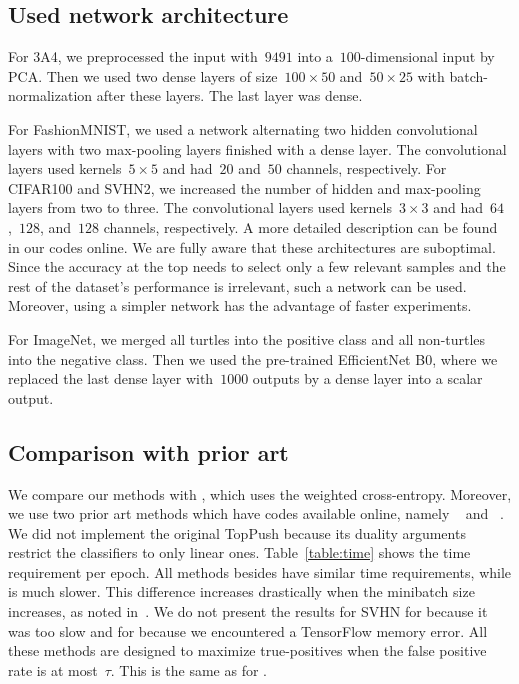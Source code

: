 \subsection{Used network architecture}\label{app:network}

For 3A4, we preprocessed the input with~$9491$ into a~$100$-dimensional input by PCA. Then we used two dense layers of size~$100\times 50$ and~$50\times 25$ with batch-normalization after these layers. The last layer was dense.

For FashionMNIST, we used a network alternating two hidden convolutional layers with two max-pooling layers finished with a dense layer. The convolutional layers used kernels~$5\times 5$ and had~$20$ and~$50$ channels, respectively. For CIFAR100 and SVHN2, we increased the number of hidden and max-pooling layers from two to three. The convolutional layers used kernels~$3\times 3$ and had~$64$,~$128$, and~$128$ channels, respectively. A more detailed description can be found in our codes online. We are fully aware that these architectures are suboptimal. Since the accuracy at the top needs to select only a few relevant samples and the rest of the dataset's performance is irrelevant, such a network can be used. Moreover, using a simpler network has the advantage of faster experiments.

For ImageNet, we merged all turtles into the positive class and all non-turtles into the negative class. Then we used the pre-trained EfficientNet B0, where we replaced the last dense layer with~$1000$ outputs by a dense layer into a scalar output.

\subsection{Comparison with prior art}\label{sec:comparison}

We compare our methods with \BaseLine, which uses the weighted cross-entropy. Moreover, we use two prior art methods which have codes available online, namely \TFCO~\cite{cotter2019optimization,narasimhan2019optimizing} and \APPerf~\cite{fathony2019ap}. We did not implement the original TopPush because its duality arguments restrict the classifiers to only linear ones. Table~\ref{table:time} shows the time requirement per epoch. All methods besides \APPerf have similar time requirements, while \APPerf is much slower. This difference increases drastically when the minibatch size increases, as noted in~\cite{fathony2019ap}. We do not present the results for SVHN for \APPerf because it was too slow and for \TFCO because we encountered a TensorFlow memory error. All these methods are designed to maximize true-positives when the false positive rate is at most~$\tau$. This is the same as for \PatMatNP.

